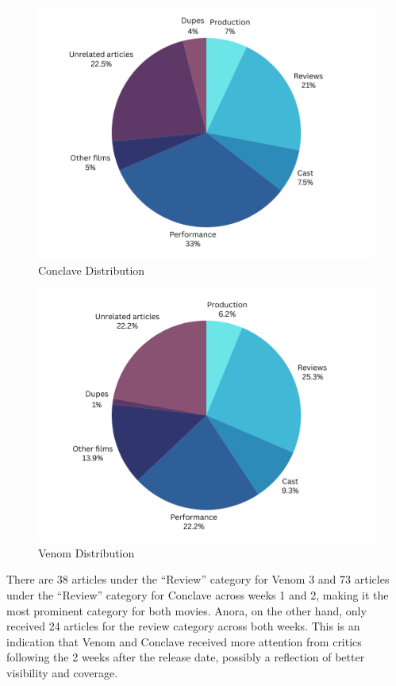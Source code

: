 \documentclass[letterpaper]{article} %
\begin{document}
\begin{figure}[H]
\centering
\includegraphics[width=0.9\columnwidth]{LaTeX/conclave_dist.png}
\caption{Conclave Distribution}
\label{fig:conclave_dist}
\end{figure}

\begin{figure}[H]
\centering
\includegraphics[width=0.9\columnwidth]{LaTeX/venom_dist.png}
\caption{Venom Distribution}
\label{fig:venom_dist}
\end{figure}


There are 38 articles under the “Review” category for Venom 3 and 73 articles under the “Review” category for Conclave across weeks 1 and 2, making it the most prominent category for both movies. Anora, on the other hand, only received 24 articles for the review category across both weeks. This is an indication that Venom and Conclave received more attention from critics following the 2 weeks after the release date, possibly a reflection of better visibility and coverage.
\end{document}
